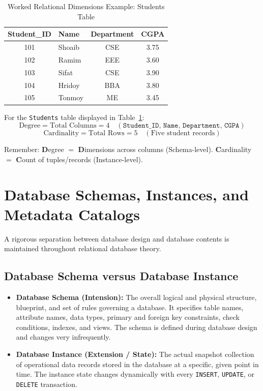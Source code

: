 \begin{table}[htbp]
\centering
\caption{Worked Relational Dimensions Example: Students Table}
\label{tab:degree_cardinality_example}
\begin{tabularx}{0.75\textwidth}{c X c c}
\toprule
\textbf{Student\_ID} & \textbf{Name} & \textbf{Department} & \textbf{CGPA} \\
\midrule
101 & Shoaib & CSE & 3.75 \\
102 & Ramim & EEE & 3.60 \\
103 & Sifat & CSE & 3.90 \\
104 & Hridoy & BBA & 3.80 \\
105 & Tonmoy & ME & 3.45 \\
\bottomrule
\end{tabularx}
\end{table}

For the \texttt{Students} table displayed in Table~\ref{tab:degree_cardinality_example}:
\[ \text{Degree} = \text{Total Columns} = 4 \quad (\texttt{Student\_ID, Name, Department, CGPA}) \]
\[ \text{Cardinality} = \text{Total Rows} = 5 \quad (\text{Five student records}) \]

\begin{tcolorbox}[colback=yellow!10!white,colframe=yellow!60!black,title=\textbf{Exam Memory Mnemonic: Columns Degree, Rows Cardinality}]
Remember: \textbf{D}egree $=$ \textbf{D}imensions across columns (Schema-level). \textbf{C}ardinality $=$ \textbf{C}ount of tuples/records (Instance-level).
\end{tcolorbox}

\newpage
\section{Database Schemas, Instances, and Metadata Catalogs}

A rigorous separation between database design and database contents is maintained throughout relational database theory.

\subsection{Database Schema versus Database Instance}

\begin{itemize}
\item \textbf{Database Schema (Intension):} The overall logical and physical structure, blueprint, and set of rules governing a database. It specifies table names, attribute names, data types, primary and foreign key constraints, check conditions, indexes, and views. The schema is defined during database design and changes very infrequently.
\item \textbf{Database Instance (Extension / State):} The actual snapshot collection of operational data records stored in the database at a specific, given point in time. The instance state changes dynamically with every \texttt{INSERT}, \texttt{UPDATE}, or \texttt{DELETE} transaction.
\end{itemize}

